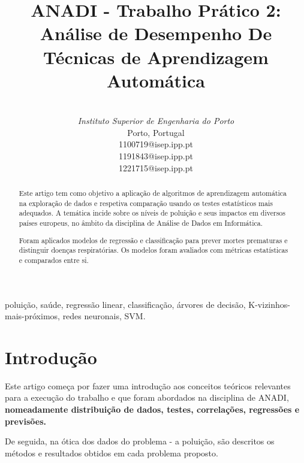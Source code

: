 \documentclass[conference]{IEEEtran}
\begin{document}
\title{ANADI - Trabalho Prático 2:\\
Análise de Desempenho De Técnicas de Aprendizagem Automática}

\author{
 \\
\textit{Instituto Superior de Engenharia do Porto}\\
Porto, Portugal \\
 1100719@isep.ipp.pt\\
 1191843@isep.ipp.pt\\
 1221715@isep.ipp.pt\\
}


\maketitle

\begin{abstract}
Este artigo tem como objetivo a aplicação de algoritmos de aprendizagem automática na exploração de dados e respetiva comparação usando os testes estatísticos mais adequados. A temática incide sobre os níveis de poluição e seus impactos em diversos países europeus, no âmbito da disciplina de Análise de Dados em Informática. 

Foram aplicados modelos de regressão e classificação para prever mortes prematuras e distinguir doenças respiratórias. Os modelos foram avaliados com métricas estatísticas e comparados entre si.
\end{abstract}

\begin{IEEEkeywords}
poluição, saúde, regressão linear, classificação, árvores de decisão, K-vizinhos-mais-próximos, redes neuronais, SVM.
\end{IEEEkeywords}

\section{Introdução}

Este artigo começa por fazer uma introdução aos conceitos teóricos relevantes para a execução do trabalho e que foram abordados na disciplina de ANADI, \textbf{nomeadamente distribuição de dados, testes, correlações, regressões e previsões. }

De seguida, na ótica dos dados do problema - a poluição, são descritos os métodos e resultados obtidos em cada problema proposto. 
\end{document}
